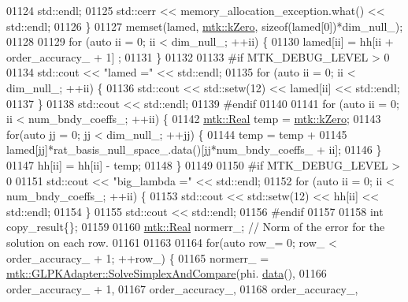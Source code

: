 \begin{DoxyCode}
{{01124         std::endl;
01125       std::cerr << memory\_allocation\_exception.what() << std::endl;
01126     \}
01127     memset(lamed, \hyperlink{group__c01-roots_ga59a451a5fae30d59649bcda274fea271}{mtk::kZero}, \textcolor{keyword}{sizeof}(lamed[0])*dim\_null\_);
01128 
01129     \textcolor{keywordflow}{for} (\textcolor{keyword}{auto} ii = 0; ii < dim\_null\_; ++ii) \{
01130       lamed[ii] = hh[ii + order\_accuracy\_ + 1] ;
01131     \}
01132 
01133 \textcolor{preprocessor}{    #if MTK\_DEBUG\_LEVEL > 0}
01134     std::cout << \textcolor{stringliteral}{"lamed ="} << std::endl;
01135     \textcolor{keywordflow}{for} (\textcolor{keyword}{auto} ii = 0; ii < dim\_null\_; ++ii) \{
01136       std::cout << std::setw(12) << lamed[ii] << std::endl;
01137     \}
01138     std::cout << std::endl;
01139 \textcolor{preprocessor}{    #endif}
01140 
01141     \textcolor{keywordflow}{for} (\textcolor{keyword}{auto} ii = 0; ii < num\_bndy\_coeffs\_; ++ii) \{
01142       \hyperlink{group__c01-roots_gac080bbbf5cbb5502c9f00405f894857d}{mtk::Real} temp = \hyperlink{group__c01-roots_ga59a451a5fae30d59649bcda274fea271}{mtk::kZero};
01143       \textcolor{keywordflow}{for}(\textcolor{keyword}{auto} jj = 0; jj < dim\_null\_; ++jj) \{
01144         temp = temp +
01145           lamed[jj]*rat\_basis\_null\_space\_.data()[jj*num\_bndy\_coeffs\_ + ii];
01146       \}
01147       hh[ii] = hh[ii] - temp;
01148     \}
01149 
01150 \textcolor{preprocessor}{    #if MTK\_DEBUG\_LEVEL > 0}
01151     std::cout << \textcolor{stringliteral}{"big\_lambda ="} << std::endl;
01152     \textcolor{keywordflow}{for} (\textcolor{keyword}{auto} ii = 0; ii < num\_bndy\_coeffs\_; ++ii) \{
01153       std::cout << std::setw(12) << hh[ii] << std::endl;
01154     \}
01155     std::cout << std::endl;
01156 \textcolor{preprocessor}{    #endif}
01157 
01158     \textcolor{keywordtype}{int} copy\_result\{\};
01159 
01160     \hyperlink{group__c01-roots_gac080bbbf5cbb5502c9f00405f894857d}{mtk::Real} normerr\_; \textcolor{comment}{// Norm of the error for the solution on each row.}
01161 
01163 
01164     \textcolor{keywordflow}{for}(\textcolor{keyword}{auto} row\_= 0; row\_ < order\_accuracy\_ + 1; ++row\_) \{
01165       normerr\_ = \hyperlink{classmtk_1_1GLPKAdapter_a834480aca83e3c0d09fdab7fdb7e8a3f}{mtk::GLPKAdapter::SolveSimplexAndCompare}(phi.
      \hyperlink{classmtk_1_1DenseMatrix_a16b3ff56feb2658b9fc7147d1de4d8e7}{data}(),
01166                                                           order\_accuracy\_ + 1,
01167                                                           order\_accuracy\_,
01168                                                           order\_accuracy\_,
}}
\end{DoxyCode}
